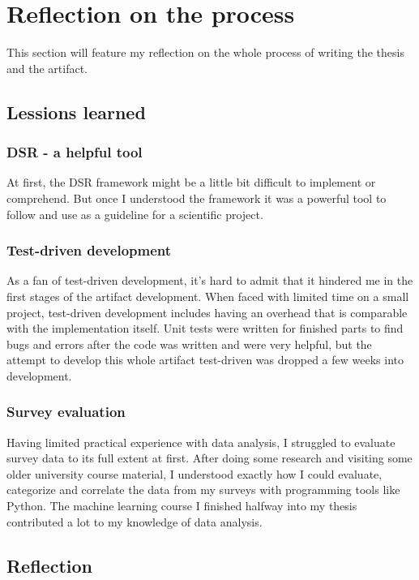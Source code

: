 \section{Reflection on the process}

This section will feature my reflection on the whole process of writing the thesis and the artifact.

\subsection{Lessions learned}

\subsubsection*{DSR - a helpful tool}

At first, the DSR framework might be a little bit difficult to implement or comprehend.
But once I understood the framework it was a powerful tool to follow and use as a guideline for a scientific project. 

\subsubsection*{Test-driven development}

As a fan of test-driven development, it's hard to admit that it hindered me in the first stages of the artifact development.
When faced with limited time on a small project, test-driven development includes having an overhead that is comparable with the implementation itself.
Unit tests were written for finished parts to find bugs and errors after the code was written and were very helpful, but the attempt to develop this whole artifact test-driven was dropped a few weeks into development.

\subsubsection*{Survey evaluation}

Having limited practical experience with data analysis, I struggled to evaluate survey data to its full extent at first.
After doing some research and visiting some older university course material, I understood exactly how I could evaluate, categorize and correlate
the data from my surveys with programming tools like Python. The machine learning course I finished halfway into my thesis contributed a lot to my knowledge of data analysis.


\subsection{Reflection}

